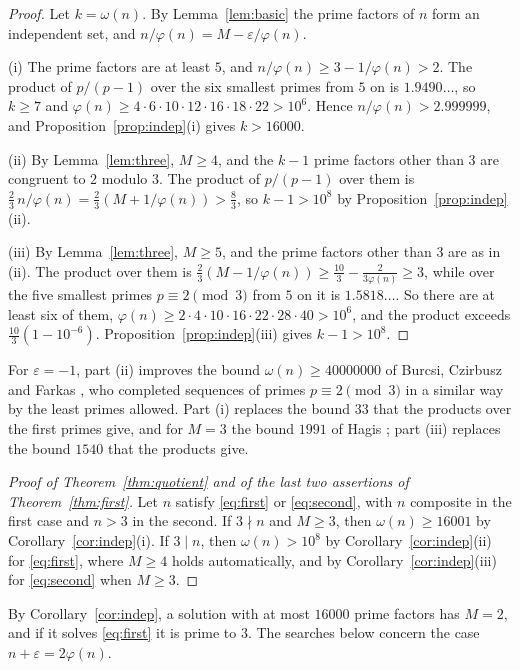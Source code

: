 \documentclass[11pt,reqno]{amsart}
\numberwithin{equation}{section}
\theoremstyle{plain}
\theoremstyle{definition}
\theoremstyle{remark}
\begin{document}
\begin{proof}
Let $k=\omega(n)$. By Lemma~\ref{lem:basic} the prime factors of $n$
form an independent set, and $n/\varphi(n)=M-\varepsilon/\varphi(n)$.

(i) The prime factors are at least $5$, and
$n/\varphi(n)\ge3-1/\varphi(n)>2$. The product of $p/(p-1)$ over the
six smallest primes from $5$ on is $1.9490\ldots$, so $k\ge7$ and
$\varphi(n)\ge4\cdot6\cdot10\cdot12\cdot16\cdot18\cdot22>10^6$. Hence
$n/\varphi(n)>2.999999$, and Proposition~\ref{prop:indep}(i) gives
$k>16000$.

(ii) By Lemma~\ref{lem:three}, $M\ge4$, and the $k-1$ prime factors
other than $3$ are congruent to $2$ modulo $3$. The product of
$p/(p-1)$ over them is $\frac23\,n/\varphi(n)=\frac23(M+1/\varphi(n))>\frac83$,
so $k-1>10^8$ by Proposition~\ref{prop:indep}(ii).

(iii) By Lemma~\ref{lem:three}, $M\ge5$, and the prime factors other
than $3$ are as in (ii). The product over them is
$\frac23(M-1/\varphi(n))\ge\frac{10}3-\frac2{3\varphi(n)}\ge3$, while
over the five smallest primes $p\equiv2\pmod3$ from $5$ on it is
$1.5818\ldots$. So there are at least six of them,
$\varphi(n)\ge2\cdot4\cdot10\cdot16\cdot22\cdot28\cdot40>10^6$, and the
product exceeds $\frac{10}3(1-10^{-6})$. Proposition~\ref{prop:indep}(iii)
gives $k-1>10^8$.
\end{proof}

For $\varepsilon=-1$, part (ii) improves the bound $\omega(n)\ge40000000$
of Burcsi, Czirbusz and Farkas \cite{BCF11}, who completed sequences of
primes $p\equiv2\pmod3$ in a similar way by the least primes allowed.
Part (i) replaces the bound $33$ that the products over the first
primes give, and for $M=3$ the bound $1991$ of Hagis \cite{Hag88}; part
(iii) replaces the bound $1540$ that the products give.

\begin{proof}[Proof of Theorem~\ref{thm:quotient} and of the last two
assertions of Theorem~\ref{thm:first}]
Let $n$ satisfy \eqref{eq:first} or \eqref{eq:second}, with $n$
composite in the first case and $n>3$ in the second. If $3\nmid n$ and
$M\ge3$, then $\omega(n)\ge16001$ by Corollary~\ref{cor:indep}(i). If
$3\mid n$, then $\omega(n)>10^8$ by Corollary~\ref{cor:indep}(ii) for
\eqref{eq:first}, where $M\ge4$ holds automatically, and by
Corollary~\ref{cor:indep}(iii) for \eqref{eq:second} when $M\ge3$.
\end{proof}

By Corollary~\ref{cor:indep}, a solution with at most $16000$ prime
factors has $M=2$, and if it solves \eqref{eq:first} it is prime to
$3$. The searches below concern the case $n+\varepsilon=2\varphi(n)$.
\end{document}
